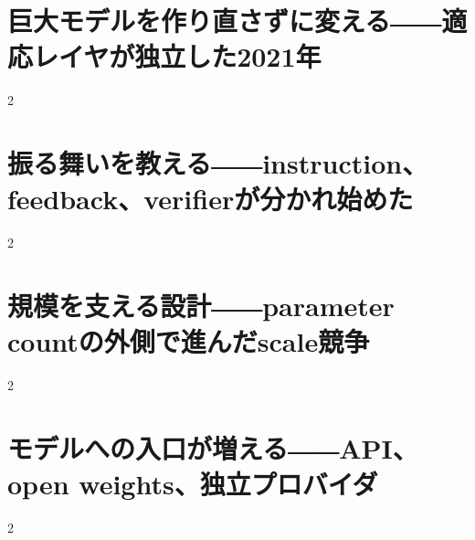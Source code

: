 \documentclass[lualatex,a4paper,11pt]{jlreq}
\begin{document}
\surveycover
\clearpage


\clearpage
\section{巨大モデルを作り直さずに変える――適応レイヤが独立した2021年}
\label{pkg:adaptation-efficient-tuning}

\medskip
\begin{multicols}{2}

\end{multicols}


\Needspace{0.30\textheight}
\bigskip
\section{振る舞いを教える――instruction、feedback、verifierが分かれ始めた}
\label{pkg:instruction-human-feedback}

\medskip
\begin{multicols}{2}

\end{multicols}


\Needspace{0.45\textheight}
\bigskip
\section{規模を支える設計――parameter countの外側で進んだscale競争}
\label{pkg:scale-sparse-systems}

\medskip
\begin{multicols}{2}

\end{multicols}


\Needspace{0.45\textheight}
\bigskip
\section{モデルへの入口が増える――API、open weights、独立プロバイダ}
\label{pkg:access-distribution}

\medskip
\begin{multicols}{2}

\end{multicols}


\Needspace{0.45\textheight}
\bigskip
\end{document}
